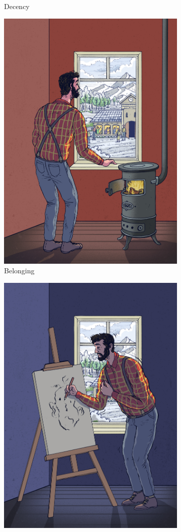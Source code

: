 \documentclass[egregdoesnotlikesansseriftitles]{scrartcl}
\begin{document}
\begin{figure}[ht!]
\begin{subfigure}[t]{0.45\textwidth}
      \caption{Decency}\label{fig:illu_decency}
   \end{subfigure}
   \begin{subfigure}[t]{0.45\textwidth}
      \centering
      \includegraphics[width=0.8\linewidth]{figures/figure_1_c.jpg}
      \caption{Belonging}\label{fig:illu_belonging}
   \end{subfigure}
   \hfill
   \begin{subfigure}[t]{0.45\textwidth}
      \centering
      \includegraphics[width=0.8\linewidth]{figures/figure_1_d.jpg}

\end{subfigure}
\end{figure}
\end{document}
